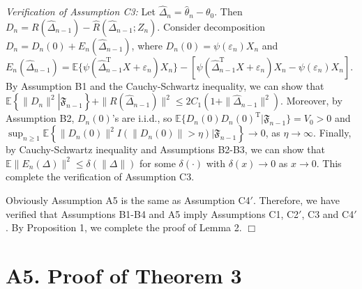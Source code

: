\documentclass[twoside,11pt]{article}
\def\trans{^{ \mathrm{\scriptscriptstyle T} }}
\def\wh{\widehat}
\begin{document}
{\it Verification of Assumption C3:}  Let $\wh{\Delta}_{n}=\wh{\theta}_{n}-\theta_0$. Then $D_n=R(\wh{\Delta}_{n-1})-\wh{R}(\wh{\Delta}_{n-1}; Z_n)$. Consider decomposition $D_n=D_n(0)+E_n(\wh{\Delta}_{n-1})$, where $D_n(0)=\psi(\varepsilon_n)X_n$ and $E_n(\wh{\Delta}_{n-1})=\mathbb{E}\{\psi(\wh{\Delta}_{n-1}\trans X+\varepsilon_n)X_n\}-[\psi(\wh{\Delta}_{n-1}\trans X+\varepsilon_n)X_n -\psi(\varepsilon_n)X_n]$. By Assumption B1 and the Cauchy-Schwartz inequality, we can show that  $\mathbb{E}\left\{\|D_n\|^2\left.\right|\mathfrak{F}_{n-1}\right\}+\|R(\wh{\Delta}_{n-1})\|^2\leq 2C_1\left(1+\|\wh{\Delta}_{n-1}\|^2\right)$. Moreover, by Assumption B2, $D_n(0)$'s are i.i.d., so $\mathbb{E}\{D_n(0)D_n(0)\trans|\mathfrak{F}_{n-1}\}=V_0>0$ and
$\sup_{n\geq 1}\mathbb{E}\left\{\|D_n(0)\|^2I(\|D_n(0)\|>\eta)|\mathfrak{F}_{n-1}\right\}{\rightarrow} 0$, as $\eta\rightarrow\infty$. Finally, by Cauchy-Schwartz inequality and Assumptions B2-B3, we can show that $\mathbb{E}\|E_n(\Delta)\|^2\leq \delta(\|\Delta\|)$ for some $\delta(\cdot)$ with $\delta(x)\rightarrow 0$ as $x\rightarrow 0$. This complete the verification of Assumption C3.

Obviously Assumption A5 is the same as Assumption C4$'$. Therefore, we have verified that Assumptions B1-B4 and A5 imply Assumptions C1, C2$'$, C3 and C4$'$. By Proposition 1, we complete the proof of Lemma 2. $\Box$

\section*{A5. Proof of Theorem 3}
\end{document}
